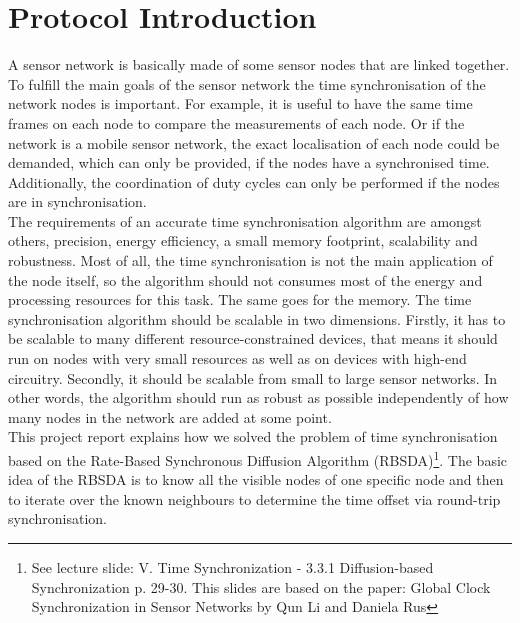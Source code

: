 \documentclass{llncs}
\begin{document}
	\section{Protocol Introduction}
	A sensor network is basically made of some sensor nodes that are linked together. To fulfill the main goals of the sensor network the time synchronisation of the network nodes is important.  For example, it is useful to have the same time frames on each node to compare the measurements of each node. Or if the network is a mobile sensor network, the exact localisation of each node could be demanded, which can only be provided, if the nodes have a synchronised time. Additionally, the coordination of duty cycles can only be performed if the nodes are in synchronisation.\\
	The requirements of an accurate time synchronisation algorithm are amongst others, precision, energy efficiency, a small memory footprint, scalability and robustness. Most of all, the time synchronisation is not the main application of the node itself, so the algorithm should not consumes most of the energy and processing resources for this task. The same goes for the memory.
	\noindent The time synchronisation algorithm should be scalable in two dimensions. Firstly, it has to be scalable to many different resource-constrained devices, that means it should run on nodes with very small resources as well as on devices with high-end circuitry. Secondly, it should be scalable from small to large sensor networks. In other words, the algorithm should run as robust as possible independently of how many nodes in the network are added at some point.\\
	\noindent This project report explains how we solved the problem of time synchronisation based on the Rate-Based Synchronous Diffusion Algorithm (RBSDA)\footnote{See lecture slide: V. Time Synchronization - 3.3.1 Diffusion-based Synchronization p. 29-30. This slides are based on the paper: Global Clock Synchronization
		in Sensor Networks by Qun Li and  Daniela Rus\cite{LiRus2006}}. The basic idea of the RBSDA is to know all the visible nodes of one specific node and then to iterate over the known neighbours to determine the time offset via round-trip synchronisation.\\
	
\end{document}
